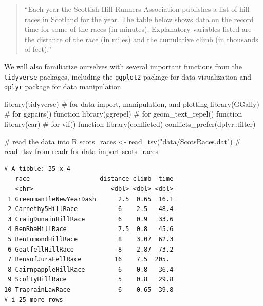 \documentclass[
  11pt,
  letterpaper,
  oneside]{book}
\newenvironment{Shaded}{\begin{snugshade}}{\end{snugshade}}
\newcommand{\CommentTok}[1]{\textcolor[rgb]{0.37,0.37,0.37}{#1}}
\newcommand{\FunctionTok}[1]{\textcolor[rgb]{0.28,0.35,0.67}{#1}}
\newcommand{\NormalTok}[1]{\textcolor[rgb]{0.00,0.23,0.31}{#1}}
\newcommand{\OtherTok}[1]{\textcolor[rgb]{0.00,0.23,0.31}{#1}}
\newcommand{\SpecialCharTok}[1]{\textcolor[rgb]{0.37,0.37,0.37}{#1}}
\newcommand{\StringTok}[1]{\textcolor[rgb]{0.13,0.47,0.30}{#1}}
\theoremstyle{plain}
\theoremstyle{plain}
\theoremstyle{definition}
\theoremstyle{definition}
\theoremstyle{plain}
\theoremstyle{remark}
\begin{document}
\begin{quote}
``Each year the Scottish Hill Runners Association publishes a list of
hill races in Scotland for the year. The table below shows data on the
record time for some of the races (in minutes). Explanatory variables
listed are the distance of the race (in miles) and the cumulative climb
(in thousands of feet).''
\end{quote}

We will also familiarize ourselves with several important functions from
the \texttt{tidyverse} packages, including the \texttt{ggplot2} package
for data visualization and \texttt{dplyr} package for data manipulation.

\begin{Shaded}
\begin{Highlighting}[]
\FunctionTok{library}\NormalTok{(tidyverse) }\CommentTok{\# for data import, manipulation, and plotting}
\FunctionTok{library}\NormalTok{(GGally)    }\CommentTok{\# for ggpairs() function}
\FunctionTok{library}\NormalTok{(ggrepel)   }\CommentTok{\# for geom\_text\_repel() function}
\FunctionTok{library}\NormalTok{(car)       }\CommentTok{\# for vif() function}
\FunctionTok{library}\NormalTok{(conflicted)}
\FunctionTok{conflicts\_prefer}\NormalTok{(dplyr}\SpecialCharTok{::}\NormalTok{filter)}
\end{Highlighting}
\end{Shaded}

\begin{Shaded}
\begin{Highlighting}[]
\CommentTok{\# read the data into R}
\NormalTok{scots\_races }\OtherTok{\textless{}{-}} \FunctionTok{read\_tsv}\NormalTok{(}\StringTok{"data/ScotsRaces.dat"}\NormalTok{) }\CommentTok{\# read\_tsv from readr for data import}
\NormalTok{scots\_races}
\end{Highlighting}
\end{Shaded}

\begin{verbatim}
# A tibble: 35 x 4
   race                   distance climb  time
   <chr>                     <dbl> <dbl> <dbl>
 1 GreenmantleNewYearDash      2.5  0.65  16.1
 2 Carnethy5HillRace           6    2.5   48.4
 3 CraigDunainHillRace         6    0.9   33.6
 4 BenRhaHillRace              7.5  0.8   45.6
 5 BenLomondHillRace           8    3.07  62.3
 6 GoatfellHillRace            8    2.87  73.2
 7 BensofJuraFellRace         16    7.5  205. 
 8 CairnpappleHillRace         6    0.8   36.4
 9 ScoltyHillRace              5    0.8   29.8
10 TraprainLawRace             6    0.65  39.8
# i 25 more rows
\end{verbatim}
\end{document}
